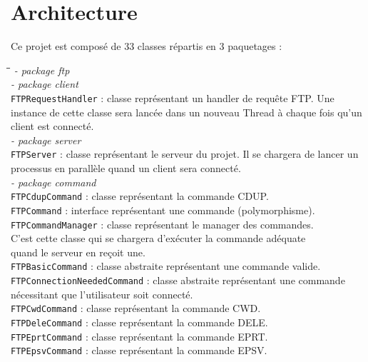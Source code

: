 \section*{Architecture}
Ce projet est composé de 33 classes répartis en 3 paquetages :
\begin{tabbing}
	\hspace{1cm}\=\hspace{1cm}\=\hspace{1cm}\=\kill
	\textit{- package ftp}\\
		\>\textit{- package client}\\
			\>\>\verb+FTPRequestHandler+ : classe représentant un handler de requête FTP. Une \\\>\>instance de cette classe sera lancée dans un nouveau Thread à chaque fois qu'un \\\>\>client est connecté.\\
		\>\textit{- package server}\\
			\>\>\verb+FTPServer+ : classe représentant le serveur du projet. Il se chargera de lancer un \\\>\>processus en parallèle quand un client sera connecté.\\
			\>\>\textit{- package command}\\
			\>\>\>\verb+FTPCdupCommand+ : classe représentant la commande CDUP.\\
			\>\>\>\verb+FTPCommand+ : interface représentant une commande (polymorphisme).\\
			\>\>\>\verb+FTPCommandManager+ : classe représentant le manager des commandes. \\\>\>\>C'est cette classe qui se chargera d'exécuter la commande adéquate \\\>\>\>quand le serveur en reçoit une.\\
			\>\>\>\verb+FTPBasicCommand+ : classe abstraite représentant une commande valide.\\
			\>\>\>\verb+FTPConnectionNeededCommand+ : classe abstraite représentant une commande \\\>\>\>nécessitant que l'utilisateur soit connecté.\\
			\>\>\>\verb+FTPCwdCommand+ : classe représentant la commande CWD.\\
			\>\>\>\verb+FTPDeleCommand+ : classe représentant la commande DELE.\\
			\>\>\>\verb+FTPEprtCommand+ : classe représentant la commande EPRT.\\
			\>\>\>\verb+FTPEpsvCommand+ : classe représentant la commande EPSV.\\

\end{tabbing}
